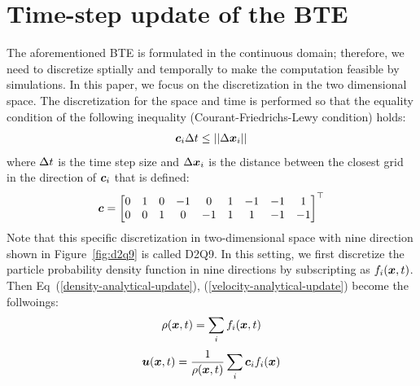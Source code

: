 \section{Time-step update of the BTE}
The aforementioned BTE is formulated in the 
continuous domain; therefore,
we need to discretize sptially and 
temporally to make the computation 
feasible by simulations.
In this paper, we focus on the discretization
in the two dimensional space.
The discretization for the space and time
is performed so that the equality condition of 
the following inequality
(Courant-Friedrichs-Lewy condition) holds\cite{peyretcomputational, sterling1996stability}:
\begin{equation}
\begin{aligned}
  \boldsymbol{c}_i \Delta t \leq || \Delta \boldsymbol{x}_i ||
\end{aligned}
\end{equation}
where $\Delta t$ is the time step size 
and $\Delta \boldsymbol{x}_i$ is the distance between 
the closest grid in the direction
of $\boldsymbol{c}_i$ that is defined:
\begin{equation}
\begin{aligned}
  \boldsymbol{c} = \begin{bmatrix}
    0 & 1 & 0 & -1 & 0 & 1 & -1 & -1 & 1 \\
    0 & 0 & 1 & 0 & -1 & 1 & 1 & -1 & -1 \\
  \end{bmatrix}^\top
\end{aligned}
\label{d2q9-velocity}
\end{equation}
Note that this specific discretization in two-dimensional
space with nine direction shown in 
Figure~\ref{fig:d2q9} is called D2Q9.
In this setting, 
we first discretize
the particle probability density function
in nine directions by subscripting 
as $f_i(\boldsymbol{x}, t)$.
Then Eq~(\ref{density-analytical-update}), (\ref{velocity-analytical-update})
become the follwoings:
\begin{equation}
  \begin{aligned}
    \rho(\boldsymbol{x}, t) &= \sum_i f_i(\boldsymbol{x}, t) \\
  \end{aligned}
  \label{discretized-density}
\end{equation}
\begin{equation}
\begin{aligned}
  \boldsymbol{u}(\boldsymbol{x}, t) &= 
  \frac{1}{\rho(\boldsymbol{x}, t)} \sum_i \boldsymbol{c}_i f_i(\boldsymbol{x}) \\
\end{aligned}
\label{discretized-velocity}
\end{equation}
